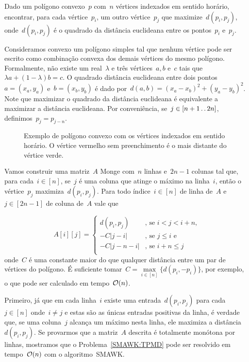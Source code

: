 \begin{prob} \label{SMAWK:TPMD}
Dado um polígono convexo~$p$ com~$n$ vértices indexados em sentido horário, encontrar, para cada vértice~$p_i$, um outro vértice~$p_j$ que maximize~$d(p_i,p_j)$, onde~$d(p_i,p_j)$ é o quadrado da distância euclideana entre os pontos~$p_i$ e~$p_j$.
\end{prob}

Consideramos convexo um polígono simples tal que nenhum vértice pode ser escrito como combinação convexa dos demais vértices do mesmo polígono. Formalmente, não existe um real~$\lambda$ e três vértices~$a,b$ e~$c$ tais que~$\lambda a + (1 - \lambda)b = c$. O quadrado distância euclideana entre dois pontos~${ a = (x_a,y_a) }$ e~${ b = (x_b,y_b) }$ é dado por~${ d(a,b) = (x_a - x_b)^2 + (y_a - y_b)^2 }$. Note que maximizar o quadrado da distância euclideana é equivalente a maximizar a distância euclideana. Por conveniência, se~$j \in [n+1 \,.\,.\, 2n]$, definimos~$p_j = p_{j-n}$.

\begin{figure}[h]
    \centering
    
    \caption{Exemplo de polígono convexo com os vértices indexados em sentido horário. O vértice vermelho sem preenchimento é o mais distante do vértice verde.} \label{SMAWK:Polygon}
\end{figure}

Vamos construir uma matriz~$A$ Monge com~$n$ linhas e~$2n - 1$ colunas tal que, para cada~$i \in [n]$, se~$j$ é uma coluna que atinge o máximo na linha~$i$, então o vértice~$p_{j}$ maximiza~$d(p_i,p_j)$. Para todo índice~$i \in [n]$ de linha de~$A$ e~$j \in [2n - 1]$ de coluna de~$A$ vale que

\begin{equation*}
A[i][j] = \begin{cases}
d(p_i,p_j) & \text{, se } i < j < i+n \text{,} \\
-C|j - i| & \text{, se } j \leq i \text{ e } \\
-C|j - n - i| & \text{, se } i + n \leq j \\
\end{cases}
\end{equation*}
onde~$C$ é uma constante maior do que qualquer distância entre um par de vértices do polígono. É suficiente tomar~$C = \max\limits_{i \in [n]}\{d(p_i,-p_i)\}$, por exemplo, o que pode ser calculado em tempo~$\mathcal{O}(n)$.

Primeiro, já que em cada linha~$i$ existe uma entrada~$d(p_i,p_j)$ para cada~$j \in [n]$ onde~$i \neq j$ e estas são as únicas entradas positivas da linha, é verdade que, se uma coluna~$j$ alcança um máximo nesta linha, ele maximiza a distância~$d(p_i,p_j)$. Se provarmos que a matriz~$A$ descrita é totalmente monótona por linhas, mostramos que o Problema~\ref{SMAWK:TPMD} pode ser resolvido em tempo~$\mathcal{O}(n)$ com o algoritmo~\textsc{SMAWK}.

